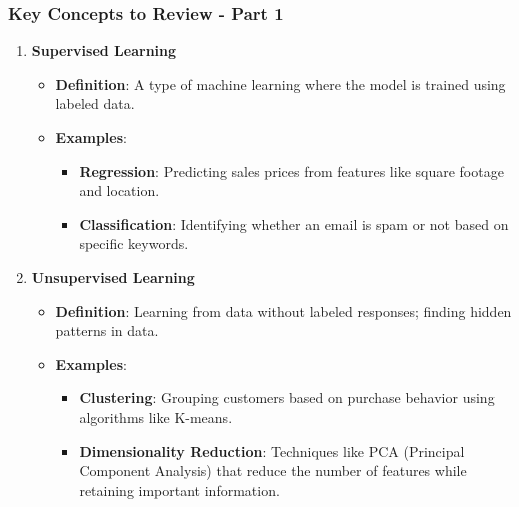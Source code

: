 \documentclass[aspectratio=169]{beamer}
\begin{document}
\begin{frame}[fragile]
    \frametitle{Key Concepts to Review - Part 1}
    \begin{enumerate}
        \item \textbf{Supervised Learning}
            \begin{itemize}
                \item \textbf{Definition}: A type of machine learning where the model is trained using labeled data.
                \item \textbf{Examples}:
                    \begin{itemize}
                        \item \textbf{Regression}: Predicting sales prices from features like square footage and location.
                        \item \textbf{Classification}: Identifying whether an email is spam or not based on specific keywords.
                    \end{itemize}
            \end{itemize}
        \item \textbf{Unsupervised Learning}
            \begin{itemize}
                \item \textbf{Definition}: Learning from data without labeled responses; finding hidden patterns in data.
                \item \textbf{Examples}:
                    \begin{itemize}
                        \item \textbf{Clustering}: Grouping customers based on purchase behavior using algorithms like K-means.
                        \item \textbf{Dimensionality Reduction}: Techniques like PCA (Principal Component Analysis) that reduce the number of features while retaining important information.
                    \end{itemize}
            \end{itemize}
    \end{enumerate}
\end{frame}
\end{document}
